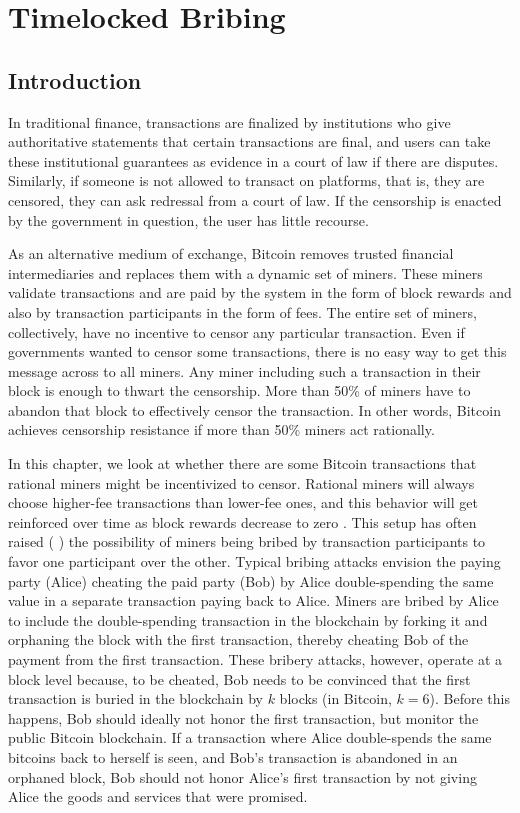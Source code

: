 \chapter{Timelocked Bribing}  %
\label{chapter:bribing}

\section{Introduction}
In traditional finance, transactions are finalized by institutions who give authoritative statements that certain transactions are final, and users can take these institutional guarantees as evidence in a court of law if there are disputes. Similarly, if someone is not allowed to transact on platforms, that is, they are censored, they can ask redressal from a court of law. If the censorship is enacted by the government in question, the user has little recourse.

As an alternative medium of exchange, Bitcoin removes trusted financial intermediaries and replaces them with a dynamic set of miners. These miners validate transactions and are paid by the system in the form of block rewards and also by transaction participants in the form of fees. The entire set of miners, collectively, have no incentive to censor any particular transaction. Even if governments wanted to censor some transactions, there is no easy way to get this message across to all miners. Any miner including such a transaction in their block is enough to thwart the censorship. More than 50\% of miners have to abandon that block to effectively censor the transaction. In other words, Bitcoin achieves censorship resistance if more than 50\% miners act rationally. 

In this chapter, we look at whether there are some Bitcoin transactions that rational miners might be incentivized to censor. Rational miners will always choose higher-fee transactions than lower-fee ones, and this behavior will get reinforced over time as block rewards decrease to zero \cite{bonneau2015sok}. This setup has often raised (\cite{feather_forking} \cite{whale_transactions} \cite{smart_contracts_for_bribing}) the possibility of miners being bribed by transaction participants to favor one participant over the other. Typical bribing attacks envision the paying party (Alice) cheating the paid party (Bob) by Alice double-spending the same value in a separate transaction paying back to Alice. Miners are bribed by Alice to include the double-spending transaction in the blockchain by forking it and orphaning the block with the first transaction, thereby cheating Bob of the payment from the first transaction. These bribery attacks, however, operate at a block level because, to be cheated, Bob needs to be convinced that the first transaction is buried in the blockchain by $k$ blocks (in Bitcoin, $k=6$). Before this happens, Bob should ideally not honor the first transaction, but monitor the public Bitcoin blockchain. If a transaction where Alice double-spends the same bitcoins back to herself is seen, and Bob's transaction is abandoned in an orphaned block, Bob should not honor Alice's first transaction by not giving Alice the goods and services that were promised.

